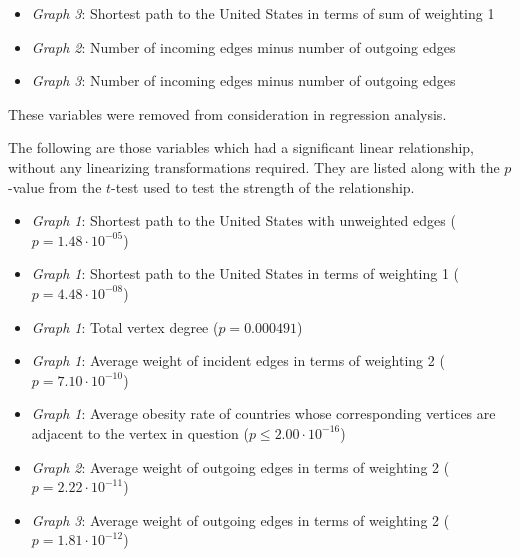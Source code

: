 \documentclass[oneside,12pt]{report}
\begin{document}
\begin{itemize}
\item \textit{Graph 3}: Shortest path to the United States in terms of sum of weighting 1
\item \textit{Graph 2}: Number of incoming edges minus number of outgoing edges
\item \textit{Graph 3}: Number of incoming edges minus number of outgoing edges
\end{itemize}

These variables were removed from consideration in regression analysis.

The following are those variables which had a significant linear relationship, without any linearizing transformations required. They are listed along with the $p$-value from the $t$-test used to test the strength of the relationship.

\begin{itemize}
\item \emph{Graph 1}: Shortest path to the United States with unweighted edges (\begin{math}p=1.48\cdot10^{-05}\end{math})
\item \emph{Graph 1}: Shortest path to the United States in terms of weighting 1 (\begin{math}p=4.48\cdot10^{-08}\end{math})
\item \emph{Graph 1}: Total vertex degree (\begin{math}p=0.000491\end{math})
\item \emph{Graph 1}: Average weight of incident edges in terms of weighting 2 (\begin{math}p=7.10\cdot10^{-10}\end{math})
\item \emph{Graph 1}: Average obesity rate of countries whose corresponding vertices are adjacent to the vertex in question (\begin{math}p\leq2.00\cdot10^{-16}\end{math})
\item \emph{Graph 2}: Average weight of outgoing edges in terms of weighting 2 (\begin{math}p=2.22\cdot10^{-11}\end{math})
\item \emph{Graph 3}: Average weight of outgoing edges in terms of weighting 2 (\begin{math}p=1.81\cdot10^{-12}\end{math})
\end{itemize}
\end{document}
